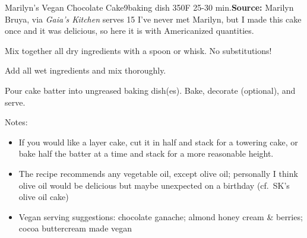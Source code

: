 \begin{recipe}[]{Marilyn's Vegan Chocolate Cake}{9\inch{}\inch baking dish \hfill 350\0F \hfill 25-30 min.}{\textbf{Source:} Marilyn Bruya, via \textit{Gaia's Kitchen} \hfill serves 15}
 \freeform I've never met Marilyn, but I made this cake once and it was delicious, so here it is with Americanized quantities.

 Mix together all dry ingredients with a spoon or whisk. No substitutions!

 Add all wet ingredients and mix thoroughly.

 \newstep Pour cake batter into ungreased baking dish(es). Bake, decorate (optional), and serve.

 \freeform Notes:
 \begin{itemize}
  \item If you would like a layer cake, cut it in half and stack for a towering cake, or bake half the batter at a time and stack for a more reasonable height.
  \item The recipe recommends any vegetable oil, except olive oil; personally I think olive oil would be delicious but maybe unexpected on a birthday (cf.\ SK's olive oil cake)
  \item Vegan serving suggestions: chocolate ganache; almond honey cream & berries; cocoa buttercream made vegan
 \end{itemize}
\end{recipe}
